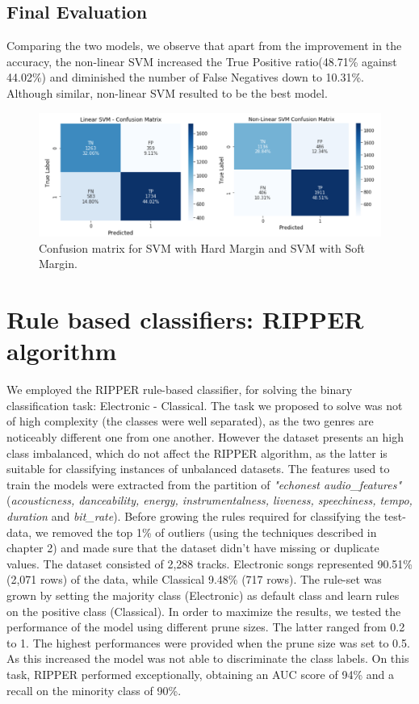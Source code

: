 \subsection{Final Evaluation}
Comparing the two models, we observe that apart from the improvement in the accuracy, the non-linear SVM increased the True Positive ratio(48.71\% against 44.02\%) and diminished the number of False Negatives down to 10.31\%. Although similar, non-linear SVM resulted to be the best model. 

\begin{figure}[!htb]
  \centering
  \includegraphics[width=0.7\linewidth]{images/Confusion_matrix-Linear-NonLinear-SVM.png}
  \caption{Confusion matrix for SVM with Hard Margin and SVM with Soft Margin.}
\end{figure}

\section{Rule based classifiers: RIPPER algorithm}

We employed the RIPPER rule-based classifier, for solving the binary classification task: Electronic - Classical. 
The task we proposed to solve was not of high complexity (the classes were well separated), as the two genres are noticeably different one from one another. However the dataset presents an high class imbalanced, which do not affect the RIPPER algorithm, as the latter is suitable for classifying instances of unbalanced datasets. The features used to train the models were extracted from the partition of \textit{"echonest audio\_features"}(\textit{acousticness, danceability, energy, instrumentalness, liveness, speechiness, tempo, duration} and \textit{bit\_rate}). Before growing the rules required for classifying the test-data, we removed the top 1\% of outliers (using the techniques described in chapter 2) and made sure that the dataset didn't have missing or duplicate values. The dataset consisted of 2,288 tracks. Electronic songs represented 90.51\% (2,071 rows) of the data, while Classical 9.48\% (717 rows).
The rule-set was grown by setting the majority class (Electronic) as default class and learn rules on the positive class (Classical). In order to maximize the results, we tested the performance of the model using different prune sizes. The latter ranged from 0.2 to 1. 
The highest performances were provided when the prune size was set to 0.5. As this increased the model was not able to discriminate the class labels. On this task, RIPPER performed exceptionally, obtaining an AUC score of 94\% and a recall on the minority class of 90\%.

